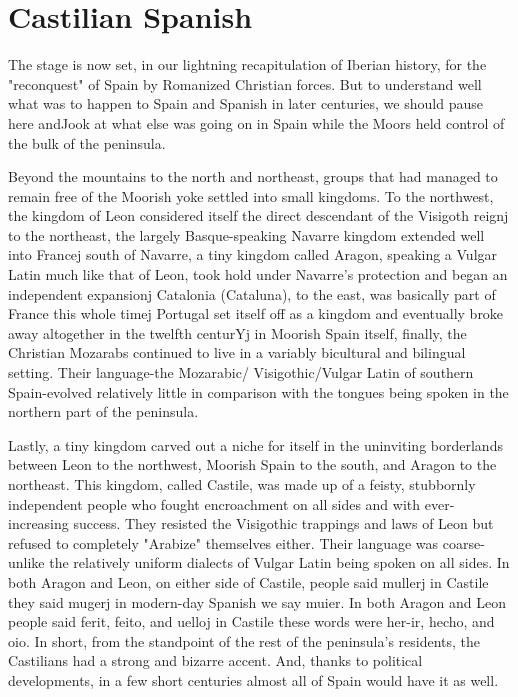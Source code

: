 \section{Castilian Spanish}

The stage is now set, in our lightning recapitulation of Iberian
history, for the "reconquest" of Spain by Romanized Christian forces.
But to understand well what was to happen to Spain and Spanish in
later centuries, we should pause here andJook at what else was going
on in Spain while the Moors held control of the bulk of the peninsula.

Beyond the mountains to the north and northeast, groups that
had managed to remain free of the Moorish yoke settled into small
kingdoms. To the northwest, the kingdom of Leon considered itself the
direct descendant of the Visigoth reignj to the northeast, the largely
Basque-speaking Navarre kingdom extended well into Francej south of
Navarre, a tiny kingdom called Aragon, speaking a Vulgar Latin much
like that of Leon, took hold under Navarre's protection and began an
independent expansionj Catalonia (Cataluna), to the east, was basically
part of France this whole timej Portugal set itself off as a kingdom and
eventually broke away altogether in the twelfth centurYj in Moorish
Spain itself, finally, the Christian Mozarabs continued to live in a variably bicultural and bilingual setting. Their language-the Mozarabic/
Visigothic/Vulgar Latin of southern Spain-evolved relatively little in
comparison with the tongues being spoken in the northern part of the
peninsula.

Lastly, a tiny kingdom carved out a niche for itself in the uninviting borderlands between Leon to the northwest, Moorish Spain to
the south, and Aragon to the northeast. This kingdom, called Castile,
was made up of a feisty, stubbornly independent people who fought
encroachment on all sides and with ever-increasing success. They resisted the Visigothic trappings and laws of Leon but refused to completely "Arabize" themselves either. Their language was coarse-unlike the relatively uniform dialects of Vulgar Latin being spoken on all
sides. In both Aragon and Leon, on either side of Castile, people said
mullerj in Castile they said mugerj in modern-day Spanish we say
muier. In both Aragon and Leon people said ferit, feito, and uelloj in
Castile these words were her-ir, hecho, and oio. In short, from the
standpoint of the rest of the peninsula's residents, the Castilians had
a strong and bizarre accent. And, thanks to political developments, in
a few short centuries almost all of Spain would have it as well.


